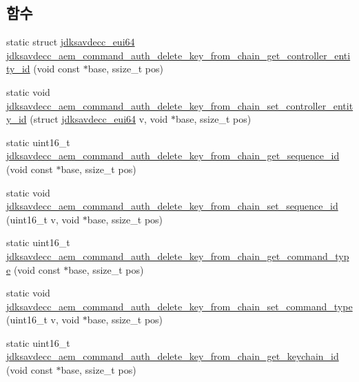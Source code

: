 \subsection*{함수}
\begin{DoxyCompactItemize}
\item 
static struct \hyperlink{structjdksavdecc__eui64}{jdksavdecc\+\_\+eui64} \hyperlink{group__command__auth__delete__key__from__chain_gad2c21b53019de8d8b1a0ac88611cfd24}{jdksavdecc\+\_\+aem\+\_\+command\+\_\+auth\+\_\+delete\+\_\+key\+\_\+from\+\_\+chain\+\_\+get\+\_\+controller\+\_\+entity\+\_\+id} (void const $\ast$base, ssize\+\_\+t pos)
\item 
static void \hyperlink{group__command__auth__delete__key__from__chain_gabb5a1d05b1d1fc4147b87427d5712b77}{jdksavdecc\+\_\+aem\+\_\+command\+\_\+auth\+\_\+delete\+\_\+key\+\_\+from\+\_\+chain\+\_\+set\+\_\+controller\+\_\+entity\+\_\+id} (struct \hyperlink{structjdksavdecc__eui64}{jdksavdecc\+\_\+eui64} v, void $\ast$base, ssize\+\_\+t pos)
\item 
static uint16\+\_\+t \hyperlink{group__command__auth__delete__key__from__chain_ga4151272a342da4ae0077508f5cf5f6ae}{jdksavdecc\+\_\+aem\+\_\+command\+\_\+auth\+\_\+delete\+\_\+key\+\_\+from\+\_\+chain\+\_\+get\+\_\+sequence\+\_\+id} (void const $\ast$base, ssize\+\_\+t pos)
\item 
static void \hyperlink{group__command__auth__delete__key__from__chain_ga7cbd7aea319f68d9838e6f4d3f34977a}{jdksavdecc\+\_\+aem\+\_\+command\+\_\+auth\+\_\+delete\+\_\+key\+\_\+from\+\_\+chain\+\_\+set\+\_\+sequence\+\_\+id} (uint16\+\_\+t v, void $\ast$base, ssize\+\_\+t pos)
\item 
static uint16\+\_\+t \hyperlink{group__command__auth__delete__key__from__chain_gae905560a17462b33748a332da4f52fbb}{jdksavdecc\+\_\+aem\+\_\+command\+\_\+auth\+\_\+delete\+\_\+key\+\_\+from\+\_\+chain\+\_\+get\+\_\+command\+\_\+type} (void const $\ast$base, ssize\+\_\+t pos)
\item 
static void \hyperlink{group__command__auth__delete__key__from__chain_ga0136dae50f7afb5d0e7f47867050eb90}{jdksavdecc\+\_\+aem\+\_\+command\+\_\+auth\+\_\+delete\+\_\+key\+\_\+from\+\_\+chain\+\_\+set\+\_\+command\+\_\+type} (uint16\+\_\+t v, void $\ast$base, ssize\+\_\+t pos)
\item 
static uint16\+\_\+t \hyperlink{group__command__auth__delete__key__from__chain_ga2145326e6661b0c699a0af29109c0d31}{jdksavdecc\+\_\+aem\+\_\+command\+\_\+auth\+\_\+delete\+\_\+key\+\_\+from\+\_\+chain\+\_\+get\+\_\+keychain\+\_\+id} (void const $\ast$base, ssize\+\_\+t pos)

\end{DoxyCompactItemize}
